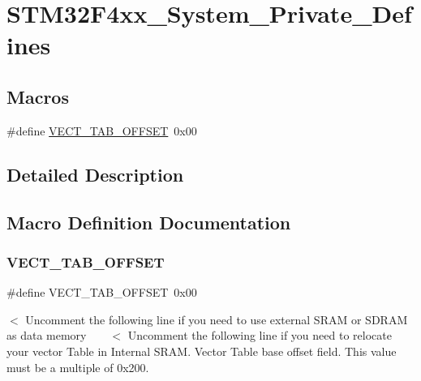\hypertarget{group__STM32F4xx__System__Private__Defines}{}\section{S\+T\+M32\+F4xx\+\_\+\+System\+\_\+\+Private\+\_\+\+Defines}
\label{group__STM32F4xx__System__Private__Defines}
\subsection*{Macros}
\begin{DoxyCompactItemize}
\item 
\#define \mbox{\hyperlink{group__STM32F4xx__System__Private__Defines_ga40e1495541cbb4acbe3f1819bd87a9fe}{V\+E\+C\+T\+\_\+\+T\+A\+B\+\_\+\+O\+F\+F\+S\+ET}}~0x00
\end{DoxyCompactItemize}


\subsection{Detailed Description}


\subsection{Macro Definition Documentation}
\mbox{\label{group__STM32F4xx__System__Private__Defines_ga40e1495541cbb4acbe3f1819bd87a9fe}} 
\subsubsection{\texorpdfstring{V\+E\+C\+T\+\_\+\+T\+A\+B\+\_\+\+O\+F\+F\+S\+ET}{VECT\_TAB\_OFFSET}}
{\footnotesize\ttfamily \#define V\+E\+C\+T\+\_\+\+T\+A\+B\+\_\+\+O\+F\+F\+S\+ET~0x00}

$<$ Uncomment the following line if you need to use external S\+R\+AM or S\+D\+R\+AM as data memory ~\newline
~\newline
 $<$ Uncomment the following line if you need to relocate your vector Table in Internal S\+R\+AM. Vector Table base offset field. This value must be a multiple of 0x200. 